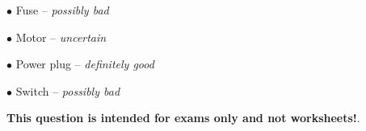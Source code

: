 
\medskip
\item{$\bullet$} Fuse -- {\it possibly bad}
\item{$\bullet$} Motor -- {\it uncertain}
\item{$\bullet$} Power plug -- {\it definitely good}
\item{$\bullet$} Switch -- {\it possibly bad}
\medskip







{\bf This question is intended for exams only and not worksheets!}.



